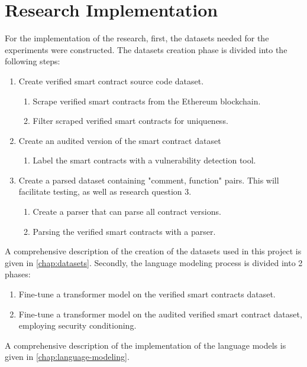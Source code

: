 



\section{Research Implementation}
\label{sec:research-implementation}

For the implementation of the research, first, the datasets needed for the experiments were constructed. The datasets creation phase is divided into the following steps:
\begin{enumerate}
    \item Create verified smart contract source code dataset.
    \begin{enumerate}
        \item Scrape verified smart contracts from the Ethereum blockchain.
        \item Filter scraped verified smart contracts for uniqueness.
    \end{enumerate}
    \item Create an audited version of the smart contract dataset
    \begin{enumerate}
        \item Label the smart contracts with a vulnerability detection tool.
    \end{enumerate}
    \item Create a parsed dataset containing "comment, function" pairs. This will facilitate testing, as well as research question 3.
    \begin{enumerate}
        \item Create a parser that can parse all contract versions.
        \item Parsing the verified smart contracts with a parser.
    \end{enumerate}
\end{enumerate}
A comprehensive description of the creation of the datasets used in this project is given in \cref{chap:datasets}.
\newline
\newline
Secondly, the language modeling process is divided into 2 phases:
\begin{enumerate}
    \item Fine-tune a transformer model on the verified smart contracts dataset.
    \item Fine-tune a transformer model on the audited verified smart contract dataset, employing security conditioning.
\end{enumerate}
A comprehensive description of the implementation of the language models is given in \cref{chap:language-modeling}.

